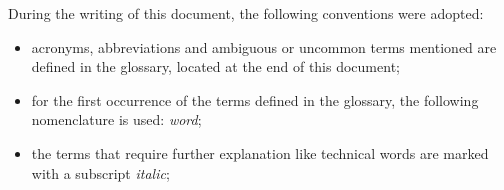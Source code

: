 During the writing of this document, the following conventions were adopted:
\begin{itemize}
    \item acronyms, abbreviations and ambiguous or uncommon terms mentioned are defined in the glossary, located at the end of this document;
    \item for the first occurrence of the terms defined in the glossary, the following nomenclature is used: \emph{word}\glsfirstoccur;
	\item the terms that require further explanation like technical words are marked with a subscript \emph{italic};
\end{itemize}
